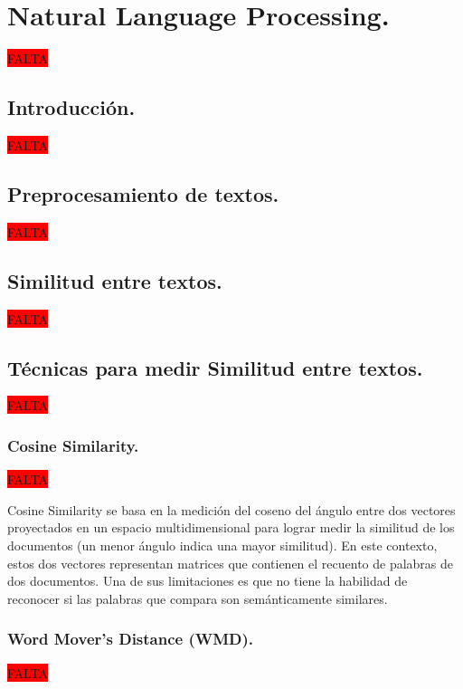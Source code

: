 \documentclass[12pt,a4paper]{article}
\begin{document}
\cleardoublepage

\section{Natural Language Processing.}\label{4.NaturalLanguageProcessing}

\colorbox{red}{FALTA}

\cleardoublepage

\subsection{Introducción.}
\colorbox{red}{FALTA}

\cleardoublepage

\subsection{Preprocesamiento de textos.}
\colorbox{red}{FALTA}

\cleardoublepage

\subsection{Similitud entre textos.}
\colorbox{red}{FALTA}

\cleardoublepage

\subsection{Técnicas para medir Similitud entre textos.}
\colorbox{red}{FALTA}

\subsubsection{Cosine Similarity.}
\colorbox{red}{FALTA}

Cosine Similarity se basa en la medición del coseno del ángulo entre dos vectores proyectados en un espacio multidimensional para lograr medir la similitud de los documentos (un menor ángulo indica una mayor similitud). En este contexto, estos dos vectores representan matrices que contienen el recuento de palabras de dos documentos. Una de sus limitaciones es que  no tiene la habilidad de reconocer si las palabras que compara son semánticamente similares.

\cleardoublepage

\subsubsection{Word Mover's Distance (WMD).}
\colorbox{red}{FALTA}
\end{document}
